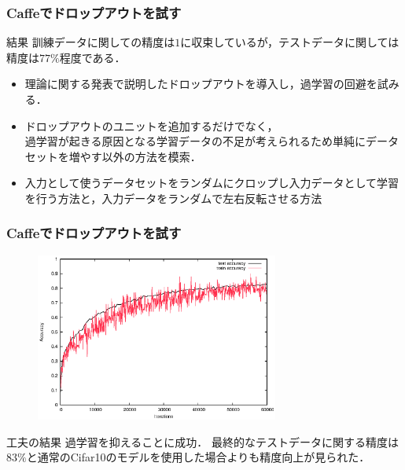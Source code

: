 \documentclass[dvipdfmx,11pt,notheorems]{beamer}
\theoremstyle{definition}
\begin{document}
\begin{frame}[fragile]\frametitle{Caffeでドロップアウトを試す}
\begin{alertblock}{結果}
訓練データに関しての精度は$1$に収束しているが，テストデータに関しては精度は$77\%$程度である．
\end{alertblock}
\begin{itemize}
  \item 理論に関する発表で説明したドロップアウトを導入し，過学習の回避を試みる．
  \item ドロップアウトのユニットを追加するだけでなく，\\過学習が起きる原因となる学習データの不足が考えられるため単純にデータセットを増やす以外の方法を模索．
  \item 入力として使うデータセットをランダムにクロップし入力データとして学習を行う方法と，入力データをランダムで左右反転させる方法
\end{itemize}
\end{frame}

\begin{frame}[fragile]\frametitle{Caffeでドロップアウトを試す}
\begin{figure}[tb]
  \begin{center}
    \includegraphics[clip,width=8cm]{./fig/eps/dropout.eps}
  \end{center}
\end{figure}
\begin{block}{工夫の結果}
過学習を抑えることに成功．
最終的なテストデータに関する精度は$83\%$と通常のCifar10のモデルを使用した場合よりも精度向上が見られた．
\end{block}
\end{frame}
\end{document}
